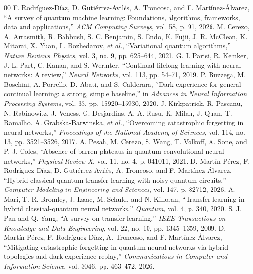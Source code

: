 \documentclass[conference]{IEEEtran}
\begin{document}

\begin{thebibliography}{00}
 F. Rodr\'iguez-D\'iaz, D. Guti\'errez-Avil\'es, A. Troncoso, and F. Mart\'inez-\'Alvarez, ``A survey of quantum machine learning: Foundations, algorithms, frameworks, data and applications,'' \emph{ACM Computing Surveys}, vol. 58, p. 91, 2026.
 M. Cerezo, A. Arrasmith, R. Babbush, S. C. Benjamin, S. Endo, K. Fujii, J. R. McClean, K. Mitarai, X. Yuan, L. Bozhedarov, \emph{et al.}, ``Variational quantum algorithms,'' \emph{Nature Reviews Physics}, vol. 3, no. 9, pp. 625--644, 2021.
 G. I. Parisi, R. Kemker, J. L. Part, C. Kanan, and S. Wermter, ``Continual lifelong learning with neural networks: A review,'' \emph{Neural Networks}, vol. 113, pp. 54--71, 2019.
 P. Buzzega, M. Boschini, A. Porrello, D. Abati, and S. Calderara, ``Dark experience for general continual learning: a strong, simple baseline,'' in \emph{Advances in Neural Information Processing Systems}, vol. 33, pp. 15920--15930, 2020.
 J. Kirkpatrick, R. Pascanu, N. Rabinowitz, J. Veness, G. Desjardins, A. A. Rusu, K. Milan, J. Quan, T. Ramalho, A. Grabska-Barwinska, \emph{et al.}, ``Overcoming catastrophic forgetting in neural networks,'' \emph{Proceedings of the National Academy of Sciences}, vol. 114, no. 13, pp. 3521--3526, 2017.
 A. Pesah, M. Cerezo, S. Wang, T. Volkoff, A. Sone, and P. J. Coles, ``Absence of barren plateaus in quantum convolutional neural networks,'' \emph{Physical Review X}, vol. 11, no. 4, p. 041011, 2021.
 D. Mart\'in-P\'erez, F. Rodr\'iguez-D\'iaz, D. Guti\'errez-Avil\'es, A. Troncoso, and F. Mart\'inez-\'Alvarez, ``Hybrid classical-quantum transfer learning with noisy quantum circuits,'' \emph{Computer Modeling in Engineering and Sciences}, vol. 147, p. 82712, 2026.
 A. Mari, T. R. Bromley, J. Izaac, M. Schuld, and N. Killoran, ``Transfer learning in hybrid classical-quantum neural networks,'' \emph{Quantum}, vol. 4, p. 340, 2020.
 S. J. Pan and Q. Yang, ``A survey on transfer learning,'' \emph{IEEE Transactions on Knowledge and Data Engineering}, vol. 22, no. 10, pp. 1345--1359, 2009.
 D. Mart\'in-P\'erez, F. Rodr\'iguez-D\'iaz, A. Troncoso, and F. Mart\'inez-\'Alvarez, ``Mitigating catastrophic forgetting in quantum neural networks via hybrid topologies and dark experience replay,'' \emph{Communications in Computer and Information Science}, vol. 3046, pp. 463--472, 2026.

\end{thebibliography}
\end{document}
